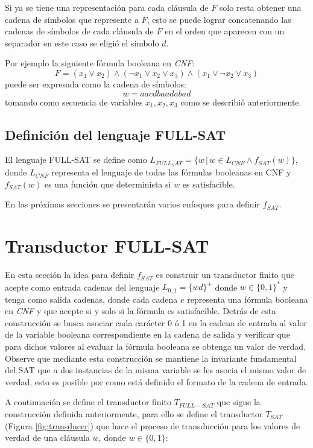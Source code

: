 \documentclass{article}
\begin{document}
Si ya se tiene una representación para cada cláusula de $F$ solo resta obtener una cadena de símbolos que represente a $F$,
esto se puede lograr concatenando las cadenas de símbolos de cada cláusula de $F$ en el orden que aparecen con un separador
en este caso se eligió el símbolo $d$.

Por ejemplo la siguiente fórmula booleana en \textit{CNF}:
$$F=(x_1 \vee x_2) \wedge (\neg x_1 \vee x_2 \vee x_3) \wedge (x_1 \vee \neg x_2 \vee x_3)$$
puede ser expresada como la cadena de símbolos:
$$w=aacdbaadabad$$
tomando como secuencia de variables $x_1, x_2, x_3$ como se describió anteriormente.

\subsection{Definición del lenguaje FULL-SAT}

El lenguaje FULL-SAT se define como $L_{FULL_SAT}=\{w\,|\,w \in L_{CNF} \wedge f_{SAT}(w)\}$, donde $L_{CNF}$ representa el lenguaje
de todas las fórmulas booleanas en CNF y $f_{SAT}(w)$ es una función que determinista si $w$ es satisfacible.

En las próximas secciones se presentarán varios enfoques para definir $f_{SAT}$.

\section{Transductor FULL-SAT}

En esta sección la idea para definir $f_{SAT}$ es construir un transductor finito que acepte como entrada cadenas del lenguaje $L_{0,1}=\{wd\}^+$ donde $w\in \{0,1\}^*$
y tenga como salida cadenas, donde cada cadena $e$ representa una fórmula booleana en \textit{CNF} y que acepte si y solo si la fórmula es satisfacible. Detrás
de esta construcción se busca asociar cada carácter 0 ó 1 en la cadena de entrada al valor de la variable booleana correspondiente en la cadena de salida y verificar que para dichos
valores al evaluar la fórmula booleana se obtenga un valor de verdad. Observe que mediante esta construcción se mantiene la invariante fundamental del SAT que a dos instancias
de la misma variable se les asocia el mismo valor de verdad, esto es posible por como está definido el formato de la cadena de entrada.

A continuación se define el transductor finito $T_{FULL-SAT}$ que sigue la construcción definida anteriormente, para ello se define
el transductor $T_{SAT}$ (Figura \ref{fig:transducer}) que hace el proceso de transducción para los valores de verdad de una cláusula $w$, donde $w\in \{0,1\}$:
\end{document}
